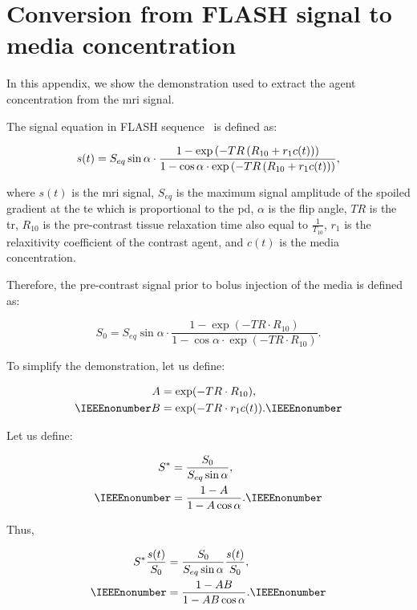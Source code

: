 \section{Conversion from FLASH signal to media concentration}\label{app:signaltoconc}

In this appendix, we show the demonstration used to extract the agent concentration from the \ac{mri} signal.

The signal equation in FLASH sequence~\cite{haase1986flash} is defined as:

\begin{equation}\footnotesize
  s(t) = S_{eq} \sin \alpha \cdot \frac{1 - \exp\left(-TR\left(R_{10} + r_1 c(t)\right)\right)}{1 - \cos \alpha \cdot \exp\left(-TR\left(R_{10} + r_1 c(t)\right)\right)} ,
  \label{eq:app:flash}
\end{equation}

\noindent where $s(t)$ is the \ac{mri} signal, $S_{eq}$ is the maximum signal amplitude of the spoiled gradient at the \ac{te} which is proportional to the \ac{pd}, $\alpha$ is the flip angle, $TR$ is the \acf{tr}, $R_{10}$ is the pre-contrast tissue relaxation time also equal to $\frac{1}{T_{10}}$, $r_1$ is the relaxitivity coefficient of the contrast agent, and $c(t)$ is the media concentration.

Therefore, the pre-contrast signal prior to bolus injection of the media is defined as:

\begin{equation}
  S_0 = S_{eq} \sin \alpha \cdot \frac{1 - \exp\left(-TR \cdot R_{10}\right)}{1 - \cos \alpha \cdot \exp\left(-TR \cdot R_{10}\right)} .
  \label{eq:app:precontrast}
\end{equation}

To simplify the demonstration, let us define:

\begin{align*}
  A &= \exp(-TR \cdot R_{10}) , \\ \IEEEnonumber
  B &= \exp(-TR \cdot r_1 c(t)) . \IEEEnonumber
\end{align*}

Let us define:

\begin{align*}
  S^{*} &= \frac{S_0}{S_{eq} \sin \alpha} , \\ \IEEEnonumber
  &= \frac{1 - A}{1 - A \cos \alpha} . \IEEEnonumber
\end{align*}

Thus,

\begin{align*}
  S^{*}\frac{s(t)}{S_0} &= \frac{S_0}{S_{eq}\sin \alpha} \frac{s(t)}{S_0} , \\ \IEEEnonumber
  &= \frac{1 - A B}{1 - A B \cos \alpha} . \IEEEnonumber
\end{align*}

